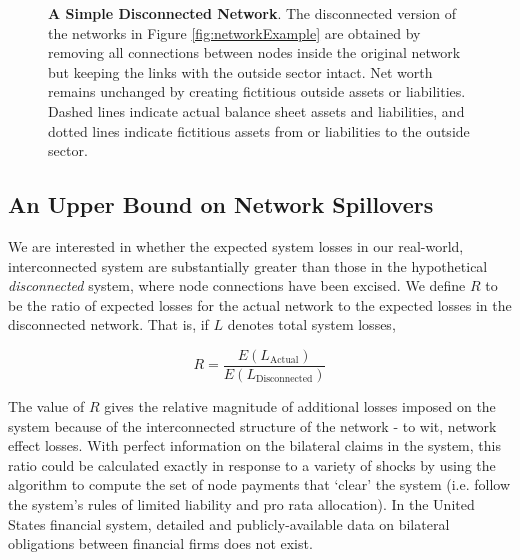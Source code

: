 \begin{figure}
\par
\begin{center}

\end{center}
\caption{\textbf{A Simple Disconnected Network}. The disconnected version of 
the networks in Figure \ref{fig:networkExample} are obtained by
removing all connections between nodes inside the original network but
keeping the links with the outside sector intact. Net
worth remains unchanged by creating fictitious outside assets or liabilities. Dashed lines indicate actual balance sheet assets and liabilities, and dotted lines indicate fictitious assets from or liabilities to the outside sector.}
\label{fig:disconnectedNetwork}\vspace{.3in}
\end{figure}

\subsection{An Upper Bound on Network Spillovers}

We are interested in whether the expected system losses in our real-world, interconnected system are substantially greater than those in the hypothetical \textit{disconnected} system, where node connections have been excised. We define $R$ to be the ratio of expected losses for the actual network to the expected losses in the disconnected network. That is, if $L$ denotes total system losses,

\begin{equation}
R=\frac{E(L_{\text{Actual}})}{E(L_\text{Disconnected})}
\end{equation}


The value of $R$ gives the relative magnitude of additional losses imposed on the system because of the interconnected structure of the network - to wit, network effect losses. With perfect information on the bilateral claims in the system, this ratio could be calculated exactly in response to a variety of shocks by using the \citet{eisenberg2001systemic} algorithm to compute the set of node payments that `clear' the system (i.e. follow the system's rules of limited liability and pro rata allocation). In the United States financial system, detailed and publicly-available data on bilateral obligations between financial firms does not exist. 

